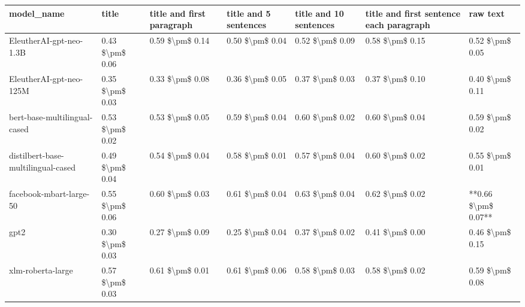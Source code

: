 \begin{tabular}{lllllll}
\toprule
                        model\_name &           title & title and first paragraph & title and 5 sentences & title and 10 sentences & title and first sentence each paragraph &            raw text \\
\midrule
           EleutherAI-gpt-neo-1.3B & 0.43 \$\textbackslash pm\$ 0.06 &           0.59 \$\textbackslash pm\$ 0.14 &       0.50 \$\textbackslash pm\$ 0.04 &        0.52 \$\textbackslash pm\$ 0.09 &                         0.58 \$\textbackslash pm\$ 0.15 &     0.52 \$\textbackslash pm\$ 0.05 \\
           EleutherAI-gpt-neo-125M & 0.35 \$\textbackslash pm\$ 0.03 &           0.33 \$\textbackslash pm\$ 0.08 &       0.36 \$\textbackslash pm\$ 0.05 &        0.37 \$\textbackslash pm\$ 0.03 &                         0.37 \$\textbackslash pm\$ 0.10 &     0.40 \$\textbackslash pm\$ 0.11 \\
      bert-base-multilingual-cased & 0.53 \$\textbackslash pm\$ 0.02 &           0.53 \$\textbackslash pm\$ 0.05 &       0.59 \$\textbackslash pm\$ 0.04 &        0.60 \$\textbackslash pm\$ 0.02 &                         0.60 \$\textbackslash pm\$ 0.04 &     0.59 \$\textbackslash pm\$ 0.02 \\
distilbert-base-multilingual-cased & 0.49 \$\textbackslash pm\$ 0.04 &           0.54 \$\textbackslash pm\$ 0.04 &       0.58 \$\textbackslash pm\$ 0.01 &        0.57 \$\textbackslash pm\$ 0.04 &                         0.60 \$\textbackslash pm\$ 0.02 &     0.55 \$\textbackslash pm\$ 0.01 \\
           facebook-mbart-large-50 & 0.55 \$\textbackslash pm\$ 0.06 &           0.60 \$\textbackslash pm\$ 0.03 &       0.61 \$\textbackslash pm\$ 0.04 &        0.63 \$\textbackslash pm\$ 0.04 &                         0.62 \$\textbackslash pm\$ 0.02 & **0.66 \$\textbackslash pm\$ 0.07** \\
                              gpt2 & 0.30 \$\textbackslash pm\$ 0.03 &           0.27 \$\textbackslash pm\$ 0.09 &       0.25 \$\textbackslash pm\$ 0.04 &        0.37 \$\textbackslash pm\$ 0.02 &                         0.41 \$\textbackslash pm\$ 0.00 &     0.46 \$\textbackslash pm\$ 0.15 \\
                 xlm-roberta-large & 0.57 \$\textbackslash pm\$ 0.03 &           0.61 \$\textbackslash pm\$ 0.01 &       0.61 \$\textbackslash pm\$ 0.06 &        0.58 \$\textbackslash pm\$ 0.03 &                         0.58 \$\textbackslash pm\$ 0.02 &     0.59 \$\textbackslash pm\$ 0.08 \\
\bottomrule
\end{tabular}
